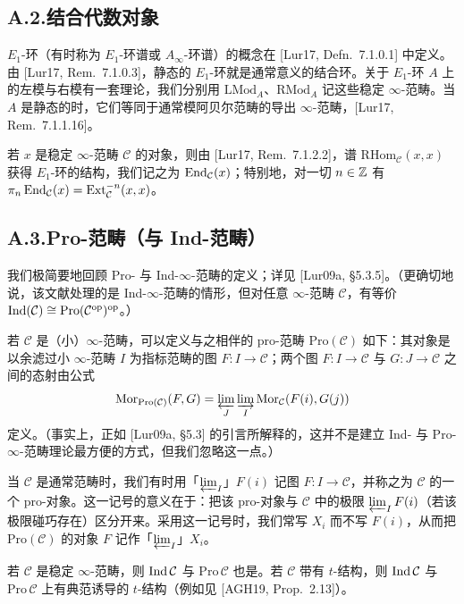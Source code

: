 \subsection*{A.2.\quad 结合代数对象}

$E_1$-环（有时称为 $E_1$-环谱或 $A_\infty$-环谱）的概念在 [Lur17, Defn.~7.1.0.1] 中定义。由 [Lur17, Rem.~7.1.0.3]，静态的 $E_1$-环就是通常意义的结合环。关于 $E_1$-环 $A$ 上的左模与右模有一套理论，我们分别用 $\mathrm{LMod}_A$、$\mathrm{RMod}_A$ 记这些稳定 $\infty$-范畴。当 $A$ 是静态的时，它们等同于通常模阿贝尔范畴的导出 $\infty$-范畴，[Lur17, Rem.~7.1.1.16]。

若 $x$ 是稳定 $\infty$-范畴 $\mathcal C$ 的对象，则由 [Lur17, Rem.~7.1.2.2]，谱 $\mathrm{RHom}_{\mathcal C}(x,x)$ 获得 $E_1$-环的结构，我们记之为 $\operatorname{End}_{\mathcal C}(x)$；特别地，对一切 $n\in\mathbb{Z}$ 有 $\pi_n\operatorname{End}_{\mathcal C}(x)=\operatorname{Ext}^{-n}_{\mathcal C}(x,x)$。

\subsection*{A.3.\quad Pro-范畴（与 Ind-范畴）}

我们极简要地回顾 Pro- 与 Ind-$\infty$-范畴的定义；详见 [Lur09a, §5.3.5]。（更确切地说，该文献处理的是 Ind-$\infty$-范畴的情形，但对任意 $\infty$-范畴 $\mathcal C$，有等价 $\operatorname{Ind}(\mathcal C)\cong\mathrm{Pro}(\mathcal C^{\mathrm{op}})^{\mathrm{op}}$。）

若 $\mathcal C$ 是（小）$\infty$-范畴，可以定义与之相伴的 pro-范畴 $\mathrm{Pro}(\mathcal C)$ 如下：其对象是以余滤过小 $\infty$-范畴 $I$ 为指标范畴的图 $F:I\to\mathcal C$；两个图 $F:I\to\mathcal C$ 与 $G:J\to\mathcal C$ 之间的态射由公式
\[
\operatorname{Mor}_{\mathrm{Pro}(\mathcal C)}(F,G)=\varprojlim_{J}\varinjlim_{I}\operatorname{Mor}_{\mathcal C}(F(i),G(j))
\]
定义。（事实上，正如 [Lur09a, §5.3] 的引言所解释的，这并不是建立 Ind- 与 Pro-$\infty$-范畴理论最方便的方式，但我们忽略这一点。）


当 $\mathcal C$ 是通常范畴时，我们有时用「$\varprojlim_I$」$F(i)$ 记图 $F:I\to\mathcal C$，并称之为 $\mathcal C$ 的一个 pro-对象。这一记号的意义在于：把该 pro-对象与 $\mathcal C$ 中的极限 $\varprojlim_I F(i)$（若该极限碰巧存在）区分开来。采用这一记号时，我们常写 $X_i$ 而不写 $F(i)$，从而把 $\mathrm{Pro}(\mathcal C)$ 的对象 $F$ 记作「$\varprojlim_I$」$X_i$。

若 $\mathcal C$ 是稳定 $\infty$-范畴，则 $\operatorname{Ind}\mathcal C$ 与 $\mathrm{Pro}\,\mathcal C$ 也是。若 $\mathcal C$ 带有 $t$-结构，则 $\operatorname{Ind}\mathcal C$ 与 $\mathrm{Pro}\,\mathcal C$ 上有典范诱导的 $t$-结构（例如见 [AGH19, Prop.~2.13]）。

